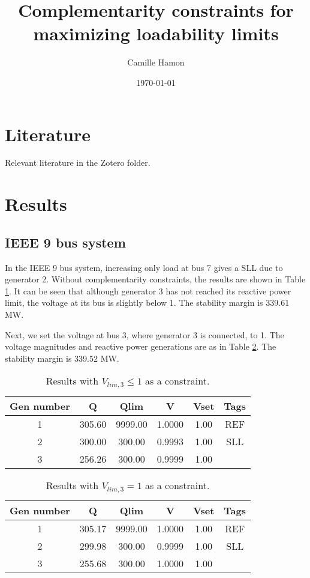 \documentclass[11pt]{article}
\title{Complementarity constraints for maximizing loadability limits}
\date{\today}
\author{Camille Hamon}
\begin{document}
\maketitle

\section{Literature}
Relevant literature in the Zotero folder.

\section{Results}

\subsection{IEEE 9 bus system}
\label{sec:ieee 9 bus system}

In the IEEE 9 bus system, increasing only load at bus 7 gives a SLL due to generator 2. Without complementarity constraints, the results are shown in Table \ref{tab:res_vlim_nonenforced}. It can be seen that although generator 3 has not reached its reactive power limit, the voltage at its bus is slightly below 1. The stability margin is 339.61 MW.

Next, we set the voltage at bus 3, where generator 3 is connected, to 1. 
The voltage magnitudes and reactive power generations are as in Table \ref{tab:res_vlim_enforced}. The stability margin is 339.52 MW.

\begin{table}[!h]
  \centering
  \begin{tabular}{cccccc}
\toprule
      Gen number & Q  & Qlim & V & Vset & Tags \\
\midrule
      1   &    305.60  &  9999.00  &  1.0000  &  1.00 &   REF\\
      2   &    300.00  &   300.00  &  0.9993  &  1.00 &   SLL\\
      3   &    256.26  &   300.00  &  0.9999  &  1.00 & \\
\bottomrule
  \end{tabular}
  \caption{Results with $V_{lim,3} \leq 1$ as a constraint.}
  \label{tab:res_vlim_nonenforced}
\end{table}

\begin{table}[!h]
  \centering
  \begin{tabular}{cccccc}
\toprule
      Gen number & Q  & Qlim & V & Vset & Tags \\
\midrule
      1 &      305.17 &   9999.00 &   1.0000  &  1.00 &   REF \\
      2 &      299.98 &    300.00 &   0.9999  &  1.00 &   SLL \\
      3 &      255.68 &    300.00 &   1.0000  &  1.00 & \\
\bottomrule
  \end{tabular}
  \caption{Results with $V_{lim,3} = 1$ as a constraint.}
  \label{tab:res_vlim_enforced}
\end{table}
\end{document}
